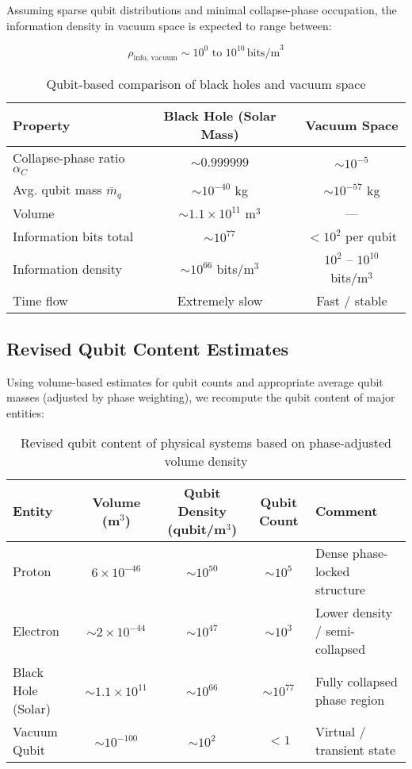 \documentclass[12pt]{report} %
\begin{document}
Assuming sparse qubit distributions and minimal collapse-phase occupation, the information density in vacuum space is expected to range between:

\[
\rho_{\text{info, vacuum}} \sim 10^0 \text{ to } 10^{10} \, \text{bits/m}^3
\]

\begin{table}[H]
\centering
\caption{Qubit-based comparison of black holes and vacuum space}
\begin{tabular}{|l|c|c|}
\hline
\textbf{Property} & \textbf{Black Hole (Solar Mass)} & \textbf{Vacuum Space} \\
\hline
Collapse-phase ratio $\alpha_C$ & $\sim 0.999999$ & $\sim 10^{-5}$ \\
\hline
Avg. qubit mass $\bar{m}_q$ & $\sim 10^{-40}$ kg & $\sim 10^{-57}$ kg \\
\hline
Volume & $\sim 1.1 \times 10^{11}$ m$^3$ & — \\
\hline
Information bits total & $\sim 10^{77}$ & $< 10^2$ per qubit \\
\hline
Information density & $\sim 10^{66}$ bits/m$^3$ & $10^2$ – $10^{10}$ bits/m$^3$ \\
\hline
Time flow & Extremely slow & Fast / stable \\
\hline
\end{tabular}
\end{table}



\subsection{Revised Qubit Content Estimates}

Using volume-based estimates for qubit counts and appropriate average qubit masses (adjusted by phase weighting), we recompute the qubit content of major entities:

\begin{table}[H]
\centering
\caption{Revised qubit content of physical systems based on phase-adjusted volume density}
\begin{tabular}{|l|c|c|c|l|}
\hline
\textbf{Entity} & \textbf{Volume (m$^3$)} & \textbf{Qubit Density (qubit/m$^3$)} & \textbf{Qubit Count} & \textbf{Comment} \\
\hline
Proton & $6 \times 10^{-46}$ & $\sim 10^{50}$ & $\sim 10^5$ & Dense phase-locked structure \\
\hline
Electron & $\sim 2 \times 10^{-44}$ & $\sim 10^{47}$ & $\sim 10^3$ & Lower density / semi-collapsed \\
\hline
Black Hole (Solar) & $\sim 1.1 \times 10^{11}$ & $\sim 10^{66}$ & $\sim 10^{77}$ & Fully collapsed phase region \\
\hline
Vacuum Qubit & $\sim 10^{-100}$ & $\sim 10^{2}$ & $< 1$ & Virtual / transient state \\
\hline
\end{tabular}
\end{table}
\end{document}
